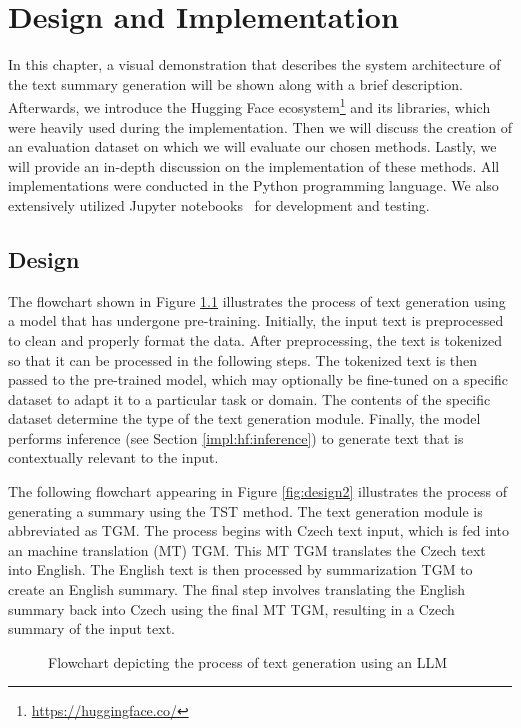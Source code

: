 \documentclass[english, ba, kiv, he, iso690numb, pdf, viewonly]{fasthesis}
\begin{document}
\chapter{Design and Implementation} \label{char:implementation}
In this chapter, a visual demonstration that describes the system architecture of the text summary generation will be shown along with a brief description. Afterwards, we introduce the Hugging Face ecosystem\footnote{\url{https://huggingface.co/}} and its libraries, which were heavily used during the implementation. Then we will discuss the creation of an evaluation dataset on which we will evaluate our chosen methods. Lastly, we will provide an in-depth discussion on the implementation of these methods. All implementations were conducted in the Python programming language. We also extensively utilized Jupyter notebooks~\cite{Kluyver2016jupyter} for development and testing.

\section{Design}
The flowchart shown in Figure \ref{fig:design1} illustrates the process of text generation using a model that has undergone pre-training. Initially, the input text is preprocessed to clean and properly format the data. After preprocessing, the text is tokenized so that it can be processed in the following steps. The tokenized text is then passed to the pre-trained model, which may optionally be fine-tuned on a specific dataset to adapt it to a particular task or domain. The contents of the specific dataset determine the type of the text generation module. Finally, the model performs inference (see Section \ref{impl:hf:inference}) to generate text that is contextually relevant to the input.

The following flowchart appearing in Figure \ref{fig:design2} illustrates the process of generating a summary using the TST method. The text generation module is abbreviated as TGM. The process begins with Czech text input, which is fed into an machine translation (MT) TGM. This MT TGM translates the Czech text into English. The English text is then processed by summarization TGM to create an English summary. The final step involves translating the English summary back into Czech using the final MT TGM, resulting in a Czech summary of the input text.
\begin{figure}[ht]
\centering
\caption{Flowchart depicting the process of text generation using an LLM}
\setlength{\fboxsep}{10pt}
\label{fig:design1}
\end{figure}
\end{document}
